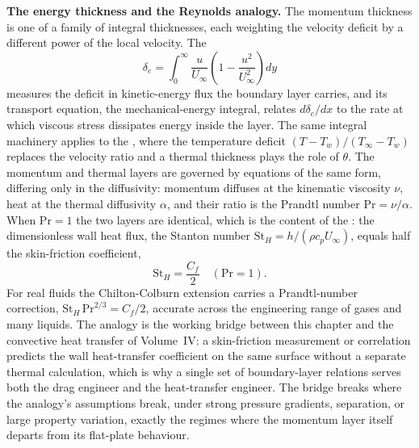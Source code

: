 \begin{mastery}
\textbf{The energy thickness and the Reynolds analogy.} The momentum
thickness is one of a family of integral thicknesses, each weighting
the velocity deficit by a different power of the local velocity. The
\[
\delta_e = \int_0^\infty \frac{u}{U_\infty}\left(1 - \frac{u^2}{
U_\infty^2}\right)dy
\]
measures the deficit in kinetic-energy flux the boundary layer
carries, and its transport equation, the mechanical-energy integral,
relates $d\delta_e/dx$ to the rate at which viscous stress dissipates
energy inside the layer. The same integral machinery applies to the
, where the temperature deficit
$(T - T_w)/(T_\infty - T_w)$ replaces the velocity ratio and a thermal
thickness plays the role of $\theta$. The momentum and thermal layers
are governed by equations of the same form, differing only in the
diffusivity: momentum diffuses at the kinematic viscosity $\nu$, heat
at the thermal diffusivity $\alpha$, and their ratio is the Prandtl
number $\text{Pr} = \nu/\alpha$. When $\text{Pr} = 1$ the two layers
are identical, which is the content of the :
the dimensionless wall heat flux, the Stanton number $\text{St}_H =
h/(\rho c_p U_\infty)$, equals half the skin-friction coefficient,
\[
\text{St}_H = \frac{C_f}{2} \quad (\text{Pr} = 1).
\]
For real fluids the Chilton-Colburn extension carries a Prandtl-number
correction, $\text{St}_H\,\text{Pr}^{2/3} = C_f/2$, accurate across
the engineering range of gases and many liquids. The analogy is the
working bridge between this chapter and the convective heat transfer
of Volume~IV: a skin-friction measurement or correlation predicts the
wall heat-transfer coefficient on the same surface without a separate
thermal calculation, which is why a single set of boundary-layer
relations serves both the drag engineer and the heat-transfer
engineer. The bridge breaks where the analogy's assumptions break,
under strong pressure gradients, separation, or large property
variation, exactly the regimes where the momentum layer itself
departs from its flat-plate behaviour.
\end{mastery}

